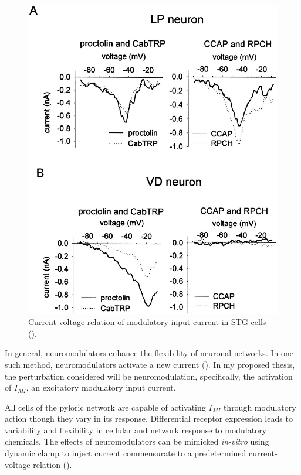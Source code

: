 \documentclass[14pt]{article}
\begin{document}
	\begin{figure}
		\centering
		\includegraphics[width=0.5\textheight]{SwensonMarder2001}
		\caption{Current-voltage relation of modulatory input current in STG cells (\cite{SwensenModulatorsconvergentcellular2001}).}
	\end{figure}

	In general, neuromodulators enhance the flexibility of neuronal networks. In one such method, neuromodulators activate a new current (\cite{GolowaschIoniccurrentslateral1992,GolowaschProctolinactivatesinward1992}). In my proposed thesis, the perturbation considered will be neuromodulation, specifically, the activation of $I_{MI}$, an excitatory modulatory input current. 
	
	All cells of the pyloric network are capable of activating $I_{MI}$ through modulatory action though they vary in its response. Differential receptor expression leads to variability and flexibility in cellular and network response to modulatory chemicals. The effects of neuromodulators can be mimicked \textit{in-vitro} using dynamic clamp to inject current commensurate to a predetermined current-voltage relation (\cite{SharpDynamicclampcomputergenerated1993,SwensenModulatorsconvergentcellular2001,SwensenMultiplepeptidesconverge2000}).
	
\end{document}
